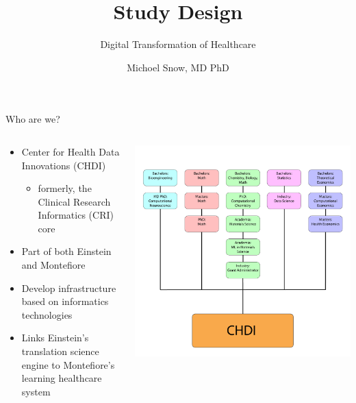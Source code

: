 \documentclass[10pt]{beamer}
\title{Study Design}
\subtitle{Digital Transformation of Healthcare}
\date{}
\author{Michoel Snow, MD PhD}
\institute{Center for Health Data Innovations}
\begin{document}
\maketitle


\begin{frame}{Who are we?}
	\begin{columns}
		\begin{column}{0.5\textwidth}
			\begin{itemize}
				\item Center for Health Data Innovations (CHDI) 
				\begin{itemize}
					\item formerly, the Clinical Research Informatics (CRI) core
				\end{itemize}
				\item Part of both Einstein and Montefiore 
				\item Develop infrastructure based on informatics technologies
				\item Links Einstein's translation science engine to Montefiore's learning healthcare system
			\end{itemize}	
		\end{column}
		\begin{column}{0.5\textwidth}
			\includegraphics[width=1\columnwidth]{images/data_science_progression.pdf}	
		\end{column}
	\end{columns}
\end{frame}
\end{document}
